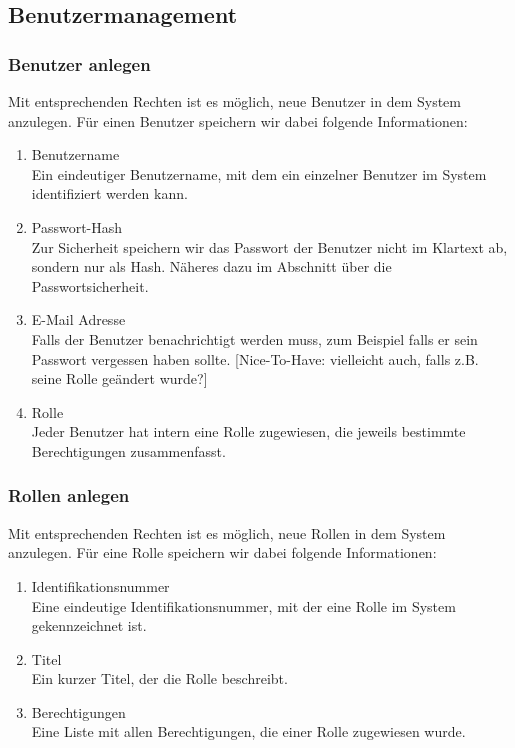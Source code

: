 \documentclass[titlepage]{article}
\begin{document}
\subsection{Benutzermanagement}

\subsubsection{Benutzer anlegen}

Mit entsprechenden Rechten ist es möglich, neue Benutzer in dem System anzulegen. Für einen Benutzer speichern wir dabei folgende Informationen:

\begin{enumerate}
	\item Benutzername\\
	Ein eindeutiger Benutzername, mit dem ein einzelner Benutzer im System identifiziert werden kann.
	\item Passwort-Hash\\
	Zur Sicherheit speichern wir das Passwort der Benutzer nicht im Klartext ab, sondern nur als Hash.
	Näheres dazu im Abschnitt über die Passwortsicherheit.
	\item E-Mail Adresse\\
	Falls der Benutzer benachrichtigt werden muss, zum Beispiel falls er sein Passwort vergessen haben sollte. [Nice-To-Have: vielleicht auch, falls z.B. seine Rolle geändert wurde?]
	\item Rolle\\
	Jeder Benutzer hat intern eine Rolle zugewiesen, die jeweils bestimmte Berechtigungen zusammenfasst.
\end{enumerate}

\subsubsection{Rollen anlegen}

Mit entsprechenden Rechten ist es möglich, neue Rollen in dem System anzulegen. Für eine Rolle speichern wir dabei folgende Informationen:

\begin{enumerate}
	\item Identifikationsnummer\\
	Eine eindeutige Identifikationsnummer, mit der eine Rolle im System gekennzeichnet ist.
	\item Titel\\
	Ein kurzer Titel, der die Rolle beschreibt.
	\item Berechtigungen\\
	Eine Liste mit allen Berechtigungen, die einer Rolle zugewiesen wurde.
\end{enumerate}
\end{document}
